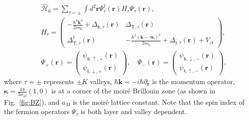 \documentclass[aps,prl,onecolumn,superscriptaddress,longbibliography]{revtex4-2}
\begin{document}
\begin{eqnarray}    &&\hat{\mathcal{H}}_0=\sum_{\tau={\pm}} \int d^2 \bm{r} \Psi_{\tau}^\dagger(\bm{r}) H_{\tau} \Psi_{\tau}(\bm{r}), \\
    &&H_{\tau}=\begin{pmatrix}
         -\frac{\hbar^2\bm{k}^2}{2m_\mathfrak{b}}+\Delta_{\mathfrak{b},\tau}(\bm{r}) &  \Delta_{\text{T},\tau}(\bm{r})\\
        \Delta_{\text{T},\tau}^\dag(\bm{r}) & -\frac{\hbar^2\left(\bm{k}-\tau \bm{\kappa}\right)^2}{2m_\mathfrak{t}}+ \Delta_\mathfrak{t,\tau}(\bm{r})+V_{z\mathfrak{t}}
    \end{pmatrix},\\
    &&\Psi_{+}(\bm{r})=\begin{pmatrix}
                    \psi_{\mathfrak{b},\uparrow,+}(\bm{r}) \\
                    \psi_{\mathfrak{t},\downarrow,+}(\bm{r}) 
                \end{pmatrix},  \quad
    \Psi_{-}(\bm{r})=\begin{pmatrix}
        \psi_{\mathfrak{b},\downarrow,-}(\bm{r}) \\
        \psi_{\mathfrak{t},\uparrow,-}(\bm{r}) 
    \end{pmatrix},
\end{eqnarray}
where $\tau=\pm $ represents $\pm K$ valleys, $\hbar \bm{k} = -i \hbar \partial_{\bm{r}}$ is the momentum operator, $\bm{\kappa}=\frac{4\pi}{3a_M}\left(1,0\right)$  is at a corner of the moir\'e Brillouin zone ({as shown in Fig.~\ref{fig:BZ}}), and $a_M$ is the moir\'e lattice constant. Note that the spin index of the fermion operators $\Psi_{\tau}$ is both layer and valley dependent.
\end{document}
